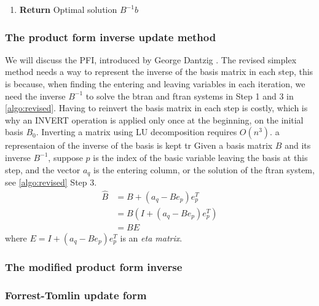 \begin{algorithm}
\begin{enumerate}
        \item \textbf{Return} Optimal solution \( B^{-1}b \)
    \end{enumerate}
\end{algorithm}\label{algo:revised}

\subsubsection*{The product form inverse update method}
We will discuss the PFI, introduced by George Dantzig \parencite{dantzig1954product}.
The revised simplex method needs a way to represent the inverse of the
basis matrix in each step, this is because, when
finding the entering and leaving variables in each iteration,
we need the inverse $B^{-1}$ to solve the \gls{btran}
and \gls{ftran} systems in Step 1 and 3 in \ref{algo:revised}.
Having to reinvert the basis matrix in each step is costly, which is why
an INVERT operation is applied only once at the beginning, on the initial basis
$B_0$. Inverting a matrix using LU decomposition requires $O(n^3)$.
a representaion of the inverse of the basis is kept tr
Given a basis matrix \( B \) and its inverse \( B^{-1} \),
suppose $p$ is the index of the basic variable leaving the basis at this step,
and the vector $a_q$ is the entering column, or the solution of the \gls{ftran}
system, see \ref{algo:revised} Step 3.
\begin{align*}
    \hat{B} & = B + (a_q - B e_p) e_p^T     \\
            & = B (I + (a_q - B e_p) e_p^T) \\
            & = B E
\end{align*}
where \( E = I + (a_q - B e_p) e_p^T \) is an \textit{eta matrix}.


\subsubsection{The modified product form inverse}

\subsubsection{Forrest-Tomlin update form}

